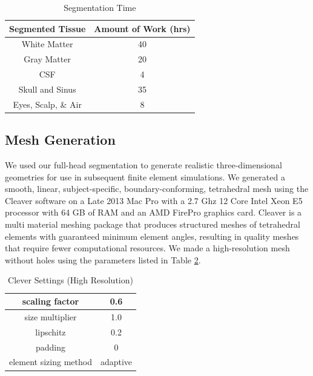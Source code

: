 \begin{table}[H]
\centering
\caption{Segmentation Time}
\label{tab:seg}
\begin{tabular}{|c|c|}
\hline
Segmented Tissue    & Amount of Work (hrs) \\ \hline
White Matter       & 40                   \\ \hline
Gray Matter         & 20                   \\ \hline
CSF                 & 4                    \\ \hline
Skull and Sinus     & 35                   \\ \hline
Eyes, Scalp, \& Air & 8                    \\ \hline
\end{tabular}
\end{table}

\subsection{Mesh Generation}
\label{sec:mesh}


We used our full-head segmentation to generate realistic three-dimensional geometries for use in subsequent finite element simulations. We generated a smooth, linear, subject-specific, boundary-conforming, tetrahedral mesh using the Cleaver software \cite{ref:cleaver} on a Late 2013 Mac Pro with a 2.7 Ghz 12 Core Intel Xeon E5 processor with 64 GB of RAM and an AMD FirePro graphics card. Cleaver is a multi material meshing package that produces structured meshes of tetrahedral elements with guaranteed minimum element angles, resulting in quality meshes that require fewer computational resources. We made a high-resolution mesh without holes using the parameters listed in Table \ref{tab:cleaver}.
\begin{table}[H]
\centering
\caption{Clever Settings (High Resolution)}
\label{tab:cleaver}
\begin{tabular}{|c|c|}
\hline
scaling factor                    & 0.6                 \\ \hline
size multiplier                   & 1.0                 \\ \hline
lipschitz                         & 0.2                 \\ \hline
padding                           & 0                   \\ \hline
element sizing method             & adaptive            \\ \hline
\end{tabular}
\end{table}

